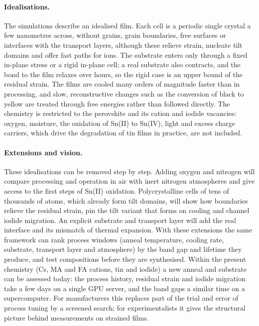 \paragraph{Idealisations.} The simulations describe an idealised film. Each cell is a periodic single crystal a few
nanometres across, without grains, grain boundaries, free surfaces or interfaces with the transport layers, although
these relieve strain, nucleate tilt domains and offer fast paths for ions. The substrate enters only through a fixed
in-plane stress or a rigid in-plane cell; a real substrate also contracts, and the bond to the film relaxes over hours,
so the rigid case is an upper bound of the residual strain. The films are cooled many orders of magnitude faster than in
processing, and slow, reconstructive changes such as the conversion of black to yellow \CsSnI{} are treated through
free energies rather than followed directly. The chemistry is
restricted to the perovskite and its cation and iodide vacancies: oxygen, moisture, the oxidation of Sn(II) to Sn(IV),
light and excess charge carriers, which drive the degradation of tin films in practice,\cite{ref_sn_instability} are
not included.

\paragraph{Extensions and vision.} These idealisations can be removed step by step. Adding oxygen and nitrogen will
compare processing and operation in air with inert nitrogen atmospheres and give access to the first steps of Sn(II)
oxidation. Polycrystalline cells of tens of thousands of atoms, which already form tilt domains, will show how boundaries relieve the residual strain, pin the tilt variant that forms on cooling
and channel iodide migration. An explicit substrate and transport layer will add the real interface and its
mismatch of thermal expansion. With these extensions the same framework can rank process windows
(anneal temperature, cooling rate, substrate, transport layer and atmosphere) by the band gap and lifetime they
produce, and test compositions before they are synthesised. Within the present chemistry (Cs, MA and FA cations, tin and iodide)
a new anneal and substrate can be assessed today: the process history, residual strain and iodide migration take a
few days on a single GPU server, and the band gaps a similar time on a supercomputer. For manufacturers this replaces
part of the trial and error of process tuning by a screened search; for experimentalists it gives
the structural picture behind measurements on strained films.
